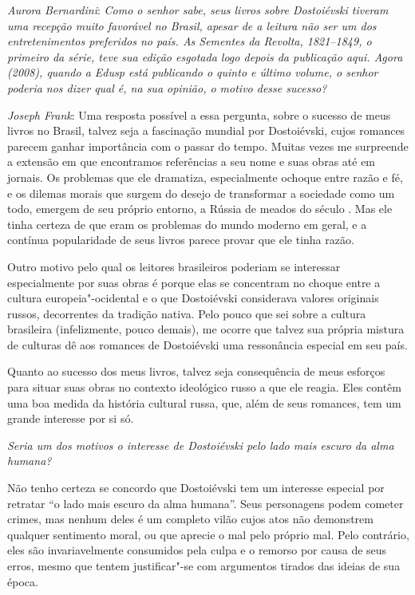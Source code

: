 \medskip

\noindent
\emph{Aurora Bernardini}: \emph{Como o senhor sabe, seus livros sobre Dostoiévski tiveram
uma recepção muito favorável no Brasil, apesar de a leitura não ser um
dos entretenimentos preferidos no país. \emph{As Sementes da Revolta,
1821--1849}, o primeiro da série, teve sua edição esgotada logo depois da
publicação aqui. Agora (2008), quando a Edusp está publicando o quinto e último
volume, o senhor poderia nos dizer qual é, na sua opinião, o motivo
desse sucesso?}


\noindent
\emph{Joseph Frank}: Uma resposta possível a essa pergunta, sobre o
sucesso de meus livros no Brasil, talvez seja a fascinação mundial por
Dostoiévski, cujos romances parecem ganhar importância com o passar do
tempo. Muitas vezes me surpreende a extensão em que encontramos
referências a seu nome e suas obras até em jornais. Os problemas que ele
dramatiza, especialmente ochoque entre razão e fé, e os dilemas morais
que surgem do desejo de transformar a sociedade como um todo,
emergem de seu próprio entorno, a Rússia de meados do século . Mas ele
tinha certeza de que eram os problemas do mundo moderno em geral, e a
contínua popularidade de seus livros parece provar que ele tinha razão.

Outro motivo pelo qual os leitores brasileiros poderiam se interessar
especialmente por suas obras é porque elas se concentram no choque entre
a cultura europeia"-ocidental e o que Dostoiévski considerava valores
originais russos, decorrentes da tradição nativa. Pelo pouco que sei
sobre a cultura brasileira (infelizmente, pouco demais), me
ocorre que talvez sua própria mistura de culturas dê aos romances de
Dostoiévski uma ressonância especial em seu país.

Quanto ao sucesso dos meus livros, talvez seja consequência de meus
esforços para situar suas obras no contexto ideológico russo a que ele
reagia. Eles contêm uma boa medida da história cultural russa, que, além
de seus romances, tem um grande interesse por si só.

\medskip

\emph{Seria um dos motivos o interesse de Dostoiévski pelo lado mais
escuro da alma humana?}

Não tenho certeza se concordo que Dostoiévski tem um interesse
especial por retratar ``o lado mais escuro da alma humana''. Seus
personagens podem cometer crimes, mas nenhum deles é um completo vilão
cujos atos não demonstrem qualquer sentimento moral, ou que aprecie o
mal pelo próprio mal. Pelo contrário, eles são invariavelmente
consumidos pela culpa e o remorso por causa de seus erros, mesmo que
tentem justificar"-se com argumentos tirados das ideias de sua época.

